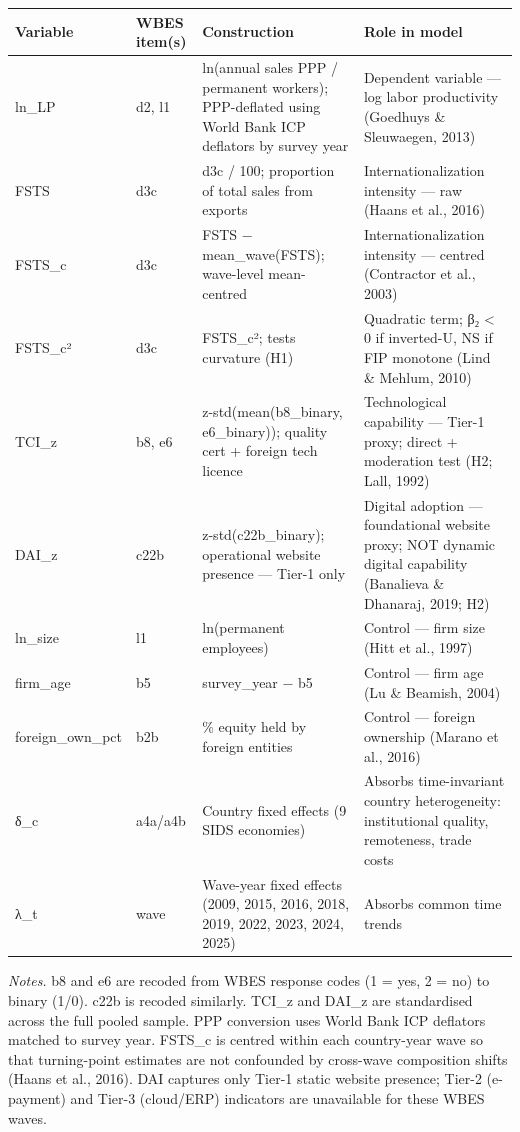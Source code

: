 \documentclass[12pt,a4paper]{article}
\begin{document}
\begin{longtable}[]{@{}llll@{}}
\toprule\noalign{}
Variable & WBES item(s) & Construction & Role in model \\
\midrule\noalign{}
\endhead
\bottomrule\noalign{}
\endlastfoot
ln\_LP & d2, l1 & ln(annual sales PPP / permanent workers); PPP-deflated
using World Bank ICP deflators by survey year & Dependent variable ---
log labor productivity (Goedhuys \& Sleuwaegen, 2013) \\
FSTS & d3c & d3c / 100; proportion of total sales from exports &
Internationalization intensity --- raw (Haans et al., 2016) \\
FSTS\_c & d3c & FSTS − mean\_wave(FSTS); wave-level mean-centred &
Internationalization intensity --- centred (Contractor et al., 2003) \\
FSTS\_c² & d3c & FSTS\_c²; tests curvature (H1) & Quadratic term; β₂
\textless{} 0 if inverted-U, NS if FIP monotone (Lind \& Mehlum,
2010) \\
TCI\_z & b8, e6 & z-std(mean(b8\_binary, e6\_binary)); quality cert +
foreign tech licence & Technological capability --- Tier-1 proxy; direct
+ moderation test (H2; Lall, 1992) \\
DAI\_z & c22b & z-std(c22b\_binary); operational website presence ---
Tier-1 only & Digital adoption --- foundational website proxy; NOT
dynamic digital capability (Banalieva \& Dhanaraj, 2019; H2) \\
ln\_size & l1 & ln(permanent employees) & Control --- firm size (Hitt et
al., 1997) \\
firm\_age & b5 & survey\_year − b5 & Control --- firm age (Lu \&
Beamish, 2004) \\
foreign\_own\_pct & b2b & \% equity held by foreign entities & Control
--- foreign ownership (Marano et al., 2016) \\
δ\_c & a4a/a4b & Country fixed effects (9 SIDS economies) & Absorbs
time-invariant country heterogeneity: institutional quality, remoteness,
trade costs \\
λ\_t & wave & Wave-year fixed effects (2009, 2015, 2016, 2018, 2019,
2022, 2023, 2024, 2025) & Absorbs common time trends \\
\end{longtable}

\emph{Notes.} b8 and e6 are recoded from WBES response codes (1 = yes, 2
= no) to binary (1/0). c22b is recoded similarly. TCI\_z and DAI\_z are
standardised across the full pooled sample. PPP conversion uses World
Bank ICP deflators matched to survey year. FSTS\_c is centred within
each country-year wave so that turning-point estimates are not
confounded by cross-wave composition shifts (Haans et al., 2016). DAI
captures only Tier-1 static website presence; Tier-2 (e-payment) and
Tier-3 (cloud/ERP) indicators are unavailable for these WBES waves.
\end{document}
